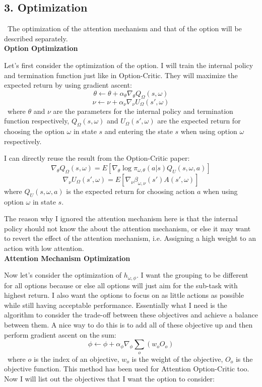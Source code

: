 \documentclass{article}
\begin{document}
	\subsection*{3. Optimization}
	\qquad \ The optimization of the attention mechanism and that of the option will be described separately.\vspace{0.2in}\\
	{\bfseries Option Optimization}\vspace{0.05in}
	
	\quad Let's first consider the optimization of the option. I will train the internal policy and termination function just like in Option-Critic. They will maximize the expected return by using gradient ascent:
	$$\theta \leftarrow \theta + \alpha_\theta \nabla_\theta Q_\Omega(s,\omega)$$
	$$\nu \leftarrow \nu + \alpha_\nu \nabla_\nu U_\Omega(s',\omega)$$
	\qquad \ where $\theta$ and $\nu$ are the parameters for the internal policy and termination function respectively, $Q_\Omega(s,\omega)$ and $U_\Omega(s',\omega)$ are the expected return for choosing the option $\omega$ in state $s$ and entering the state $s$ when using option $\omega$ respectively.
	
	\quad I can directly reuse the result from the Option-Critic paper:
	$$\nabla_\theta Q_\Omega(s,\omega) = E[\nabla_\theta \log \pi_{\omega, \theta}(a|s) Q_U(s,\omega,a)]$$
	$$\nabla_\nu U_\Omega(s',\omega) = E[\nabla_\nu \beta_{\omega, \nu}(s') A(s',\omega)]$$
	\qquad where $Q_U(s,\omega,a)$ is the expected return for choosing action $a$ when using option $\omega$ in state $s$.
	
	\quad The reason why I ignored the attention mechanism here is that the internal policy should not know the about the attention mechanism, or else it may want to revert the effect of the attention mechanism, i.e. Assigning a high weight to an action with low attention.\vspace{0.2in}\\
	{\bfseries Attention Mechanism Optimization}\vspace{0.05in}
	
	\quad Now let's consider the optimization of $h_{\omega,\phi}$. I want the grouping to be different for all options because or else all options will just aim for the sub-task with highest return. I also want the options to focus on as little actions as possible while still having acceptable performance. Essentially what I need is the algorithm to consider the trade-off between these objectives and achieve a balance between them. A nice way to do this is to add all of these objective up and then perform gradient ascent on the sum: $$\phi \leftarrow \phi + \alpha_\phi \nabla_\phi \sum_{o} (w_o O_o)$$ \qquad \ where $o$ is the index of an objective, $w_o$ is the weight of the objective, $O_o$ is the objective function.
	\quad This method has been used for Attention Option-Critic too. Now I will list out the objectives that I want the option to consider: 
	
\end{document}
